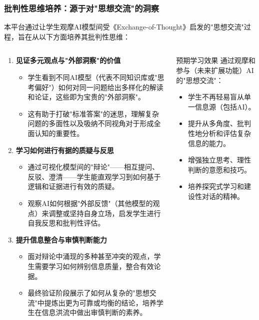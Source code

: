 \documentclass[aspectratio=169]{beamer} %
\begin{document}
\begin{frame}[allowframebreaks]
\frametitle{批判性思维培养：源于对"思想交流"的洞察}
本平台通过让学生观摩AI模型间受《Exchange-of-Thought》启发的"思想交流"过程，旨在从以下方面培养其批判性思维：
\begin{columns}
\begin{column}{0.6\textwidth}
\begin{enumerate}
    \item \textbf{见证多元观点与"外部洞察"的价值}
    \begin{itemize}
        \item 学生看到不同AI模型（代表不同知识库或"思考偏好"）如何对同一问题给出多样化的解读和论证，这些即为宝贵的"外部洞察"。
        \item 这有助于打破"标准答案"的迷思，理解复杂问题的多面性以及吸纳不同视角对于形成全面认知的重要性。
    \end{itemize}

    \item \textbf{学习如何进行有据的质疑与反思}
    \begin{itemize}
        \item 通过可视化模型间的"辩论"——相互提问、反驳、澄清——学生能直观学习到如何基于逻辑和证据进行有效的质疑。
        \item 观察AI如何根据"外部反馈"（其他模型的观点）来调整或坚持自身立场，启发学生进行自我反思和批判性评估。
    \end{itemize}

    \item \textbf{提升信息整合与审慎判断能力}
    \begin{itemize}
        \item 面对辩论中涌现的多种甚至冲突的观点，学生需要学习如何辨别信息质量，整合有效论据。
        \item 最终验证阶段展示了如何从复杂的"思想交流"中提炼出更为可靠或均衡的结论，培养学生在信息洪流中做出审慎判断的素养。
    \end{itemize}
\end{enumerate}
\end{column}
\begin{column}{0.4\textwidth}
\begin{block}{预期学习效果}
通过观摩和参与（未来扩展功能）AI的"思想交流"：
\begin{itemize}
    \item 学生不再轻易盲从单一信息源（包括AI）。
    \item 提升从多角度、批判性地分析和评估复杂信息的能力。
    \item 增强独立思考、理性判断的意愿和技巧。
    \item 培养探究式学习和建设性对话的精神。
\end{itemize}
\end{block}
\end{column}
\end{columns}
\end{frame}
\end{document}
